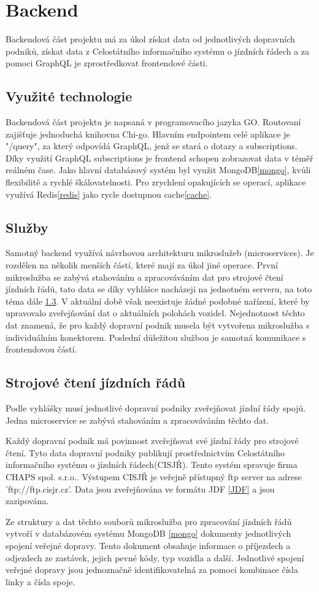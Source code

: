 \section{Backend}
Backendová část projektu má za úkol získat data od jednotlivých dopravních podniků, získat data z Celostátního informačního systému o jízdních řádech\cite{cisjr} a za pomoci GraphQL je zprostředkovat frontendové části.
\subsection{Využité technologie}
Backendová část projektu je napsaná v programovacího jazyka GO. Routovaní zajišťuje jednoduchá knihovna Chi-go. Hlavním endpointem celé aplikace je "/query", za který odpovídá GraphQL, jenž se stará o dotazy a subscriptions. Díky využití GraphQL subscriptions je frontend schopen zobrazovat data v téměř reálném čase. Jako hlavní databázový systém byl využit MongoDB\ref{mongo}, kvůli flexibilitě a rychlé škálovatelnosti. Pro zrychlení opakujících se operací, aplikace využívá Redis\ref{redis} jako rycle dostupnou cache\ref{cache}. \par
\subsection{Služby}
Samotný backend využívá návrhovou architekturu mikroslužeb (microservices). Je rozdělen na několik menších částí, které mají za úkol jiné operace. První mikroslužba se zabývá stahováním a zpracováváním dat pro strojové čtení jízdních řádů, tato data se díky vyhlášce\cite{vyhlaskaJizdniRady} nacházejí na jednotném serveru, na toto téma dále \ref{strojoveCteniJR}. V aktuální době však neexistuje žádné podobné nařízení, které by upravovalo zveřejňování dat o aktuálních polohách vozidel. Nejednotnost těchto dat znamená, že pro každý dopravní podnik musela být vytvořena mikroslužba s individuálním konektorem. Poslední důležitou službou je samotná komunikace s frontendovou částí.
\subsection [Jízdní řády]{Strojové čtení jízdních řádů} \label{strojoveCteniJR}
Podle vyhlášky\cite{vyhlaskaJizdniRady} musí jednotlivé dopravní podniky zveřejňovat jízdní řády spojů. Jedna microservice se zabývá stahováním a zpracováváním těchto dat. \par
Každý dopravní podnik má povinnost zveřejňovat své jízdní řády pro strojové čtení. Tyto data dopravní podniky publikují prostřednictvím Celostátního informačního systému o jízdních řádech(CISJŘ)\cite{cisjr}. Tento systém spravuje firma CHAPS spol. s.r.o.\cite{chaps}. Výstupem CISJŘ je veřejně přístupný ftp server na adrese 'ftp://ftp.cisjr.cz'. Data jsou zveřejňována ve formátu JDF \ref{JDF} a jsou zazipována. \par
Ze struktury a dat těchto souborů mikroslužba pro zpracování jízdních řádů vytvoří v databázovém systému MongoDB \ref{mongo} dokumenty jednotlivých spojení veřejné dopravy. Tento dokument obsahuje informace o příjezdech a odjezdech ze zastávek, jejich pevné kódy, typ vozidla a další. Jednotlivé spojení veřejné dopravy jsou jednoznačně identifikovatelná za pomoci kombinace čísla linky a čísla spoje.

